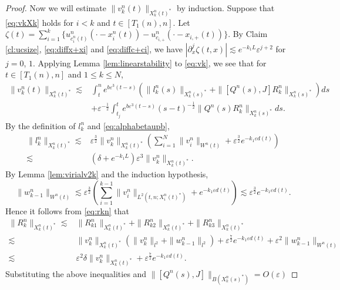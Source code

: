 \documentclass[11pt]{amsart}
\theoremstyle{remark}
\numberwithin{equation}{section}
\begin{document}
\begin{proof}
Now we will estimate $\|v_k^n(t)\|_{X_k^n(t)^*}$ by induction. Suppose that
\eqref{eq:vkXk} holds for $i<k$ and $t\in[T_1(n),n]$.
Let $\zeta(t)=\sum_{i=1}^k\{u_{c_i^n(t)}^n(\cdot-x_i^n(t))
-u_{c_{i,+}}^n(\cdot-x_{i,+}(t))\}$.
By Claim \ref{cl:ucsize}, \eqref{eq:diffx+xi} and \eqref{eq:diffc+ci}, we have
$|{\partial}_x^j\zeta(t,x)|\lesssim e^{-k_1L}{\varepsilon}^{j+2}$ for $j=0$, $1$.
Applying Lemma \ref{lem:linearstability}
to \eqref{eq:vk}, we see that for $t\in[T_1(n),n]$ and $1\le k\le N$,
\begin{equation}
  \label{eq:v2kint1}
  \begin{split}
\|v_k^n(t)\|_{X_k^n(t)^*}\lesssim  & \int_t^n e^{b{\varepsilon}^3(t-s)}
\left(\|l_k^n(s)\|_{X_k^n(s)^*}+\|[Q^n(s),J]R_k^n\|_{X_k^n(s)^*}\right)ds
\\ & +{\varepsilon}^{-\frac12}\int_{t_j}^te^{b{\varepsilon}^3(t-s)}(s-t)^{-\frac12}
\|Q^n(s)R_k^n\|_{X_k^n(s)^*}ds.  
\end{split}
\end{equation}
By the definition of $l_k^n$ and \eqref{eq:alphabetaupb},
\begin{equation}
  \label{eq:lkn}
  \begin{split}
\|l_k^n\|_{X_k^n(t)^*}\lesssim & 
{\varepsilon}^{\frac32}\|v_k^n\|_{X_k^n(t)^*}\left(\sum_{i=1}^{N}\|v_i^n\|_{W^n(t)}
+{\varepsilon}^{\frac32}e^{-k_1{\varepsilon} d(t)}\right)
\\ \lesssim & (\delta+e^{-k_1L}){\varepsilon}^3\|v_k^n\|_{X_k^n(t)^*}.      
  \end{split}
\end{equation}
By Lemma \ref{lem:virialv2k} and the induction hypothesis,
$$\|w_{k-1}^n\|_{W^n(t)} \lesssim
{\varepsilon}^{\frac32}\left(\sum_{i=1}^{k-1}\|v_i^n\|_{L^2(t,n;X_i^n(t)^*)}+e^{-k_1{\varepsilon} d(t)}\right)
\lesssim {\varepsilon}^{\frac32}e^{-k_1{\varepsilon} d(t)}.$$
Hence it follows from \eqref{eq:rkn} that
 \begin{align*}
\|R_k^n\|_{X_k^n(t)^*}\lesssim & 
\|R_{k1}^n\|_{X_k^n(t)^*}+\|R_{k2}^n\|_{X_k^n(t)^*}+\|R_{k3}^n\|_{X_k^n(t)^*}
\\ \lesssim & 
\|v_k^n\|_{X_k^n(t)^*}(\|v_k^n\|_{l^2}+ \|w_{k-1}^n\|_{l^2})
+{\varepsilon}^{\frac72}e^{-k_1{\varepsilon} d(t)}+{\varepsilon}^2\|w_{k-1}^n\|_{W^n(t)}
\\ \lesssim &  {\varepsilon}^2\delta\|v_k^n\|_{X_k^n(t)^*}+{\varepsilon}^{\frac72}e^{-k_1{\varepsilon} d(t)}.
 \end{align*}
Substituting the above inequalities and $\|[Q^n(s),J]\|_{B(X_k^n(s)^*)}=O({\varepsilon})$

\end{proof}
\end{document}
